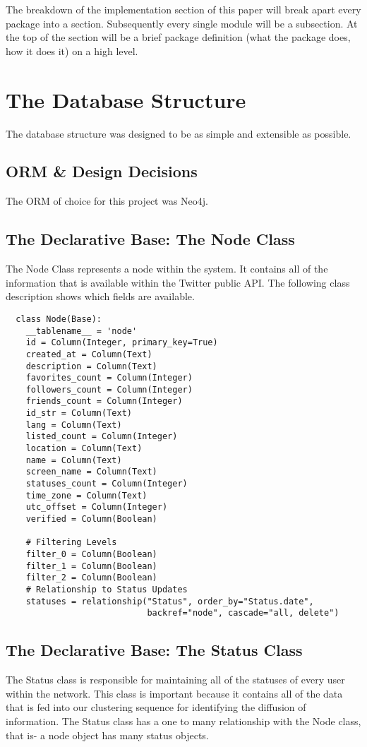 The breakdown of the implementation section of this paper will break apart every package into a section. Subsequently every single module will be a subsection. At the top of the section will be a brief package definition (what the package does, how it does it) on a high level.

\section{The Database Structure}
The database structure was designed to be as simple and extensible as possible.

\subsection{ORM \& Design Decisions}
The ORM of choice for this project was Neo4j.

\subsection{The Declarative Base: The Node Class}
The Node Class represents a node within the system. It contains all of the information that is available within the Twitter public API. The following class description shows which fields are available.

\begin{lstlisting}
  class Node(Base):
    __tablename__ = 'node'
    id = Column(Integer, primary_key=True)
    created_at = Column(Text)
    description = Column(Text)
    favorites_count = Column(Integer)
    followers_count = Column(Integer)
    friends_count = Column(Integer)
    id_str = Column(Text)
    lang = Column(Text)
    listed_count = Column(Integer)
    location = Column(Text)
    name = Column(Text)
    screen_name = Column(Text)
    statuses_count = Column(Integer)
    time_zone = Column(Text)
    utc_offset = Column(Integer)
    verified = Column(Boolean)

    # Filtering Levels
    filter_0 = Column(Boolean)
    filter_1 = Column(Boolean)
    filter_2 = Column(Boolean)
    # Relationship to Status Updates
    statuses = relationship("Status", order_by="Status.date",
                            backref="node", cascade="all, delete")
\end{lstlisting}

\subsection{The Declarative Base: The  Status Class}
The Status class is responsible for maintaining all of the statuses of every user within the network. This class is important because it contains all of the data that is fed into our clustering sequence for identifying the diffusion of information. The Status class has a one to many relationship with the Node class, that is- a node object has many status objects.

